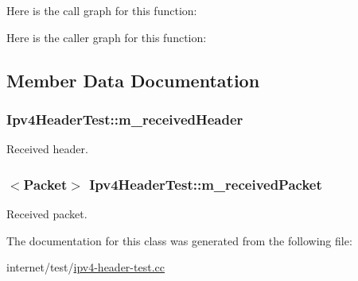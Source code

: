 Here is the call graph for this function\+:




Here is the caller graph for this function\+:




\subsection{Member Data Documentation}
\subsubsection[{\texorpdfstring{m\+\_\+received\+Header}{m_receivedHeader}}]{ Ipv4\+Header\+Test\+::m\+\_\+received\+Header\hspace{0.3cm}{\ttfamily [private]}}\hypertarget{classIpv4HeaderTest_a667ff4bfd280469a2814685903b1159f}{}\label{classIpv4HeaderTest_a667ff4bfd280469a2814685903b1159f}


Received header. 

\subsubsection[{\texorpdfstring{m\+\_\+received\+Packet}{m_receivedPacket}}]{$<${\bf Packet}$>$ Ipv4\+Header\+Test\+::m\+\_\+received\+Packet\hspace{0.3cm}{\ttfamily [private]}}\hypertarget{classIpv4HeaderTest_a4806396ea5249b214fce8a349f40b07b}{}\label{classIpv4HeaderTest_a4806396ea5249b214fce8a349f40b07b}


Received packet. 



The documentation for this class was generated from the following file\+:\begin{DoxyCompactItemize}
\item 
internet/test/\hyperlink{ipv4-header-test_8cc}{ipv4-\/header-\/test.\+cc}\end{DoxyCompactItemize}
